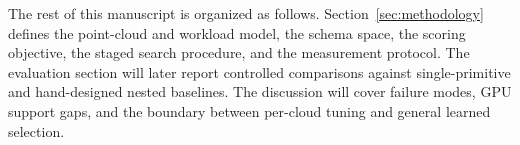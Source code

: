 The rest of this manuscript is organized as follows. Section~\ref{sec:methodology} defines the point-cloud and workload model, the schema space, the scoring objective, the staged search procedure, and the measurement protocol. The evaluation section will later report controlled comparisons against single-primitive and hand-designed nested baselines. The discussion will cover failure modes, GPU support gaps, and the boundary between per-cloud tuning and general learned selection.
